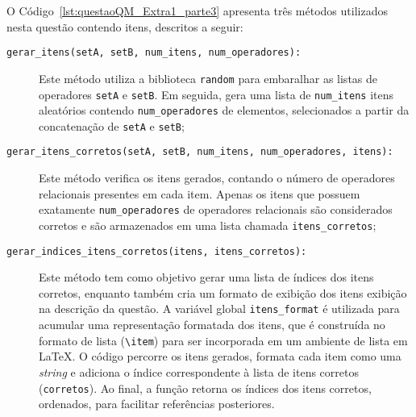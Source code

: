 O Código~\ref{lst:questaoQM_Extra1_parte3} apresenta três métodos utilizados nesta questão contendo itens, descritos a seguir:

\begin{description}
    \item[\texttt{gerar\_itens(setA, setB, num\_itens, num\_operadores):}]
    Este método utiliza a biblioteca \verb|random| para embaralhar as listas de operadores \verb|setA| e \verb|setB|. Em seguida, gera uma lista de \verb|num_itens| itens aleatórios contendo \verb|num_operadores| de elementos, selecionados a partir da concatenação de \verb|setA| e \verb|setB|;

    \item[\texttt{gerar\_itens\_corretos(setA, setB, num\_itens, num\_operadores, itens):}]
    Este método verifica os itens gerados, contando o número de operadores relacionais presentes em cada item. Apenas os itens que possuem exatamente \verb|num_operadores| de operadores relacionais são considerados corretos e são armazenados em uma lista chamada \verb|itens_corretos|;

    \item[\texttt{gerar\_indices\_itens\_corretos(itens, itens\_corretos):}]
    Este método tem como objetivo gerar uma lista de índices dos itens corretos, enquanto também cria um formato de exibição dos itens exibição na descrição da questão. A variável global \verb|itens_format| é utilizada para acumular uma representação formatada dos itens, que é construída no formato de lista (\texttt{\textbackslash item}) para ser incorporada em um ambiente de lista em \LaTeX. O código percorre os itens gerados, formata cada item como uma \textit{string} e adiciona o índice correspondente à lista de itens corretos (\verb|corretos|). Ao final, a função retorna os índices dos itens corretos, ordenados, para facilitar referências posteriores.
\end{description}

